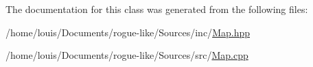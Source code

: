 The documentation for this class was generated from the following files\-:\begin{DoxyCompactItemize}
\item 
/home/louis/\-Documents/rogue-\/like/\-Sources/inc/\hyperlink{_map_8hpp}{Map.\-hpp}\item 
/home/louis/\-Documents/rogue-\/like/\-Sources/src/\hyperlink{_map_8cpp}{Map.\-cpp}\end{DoxyCompactItemize}
